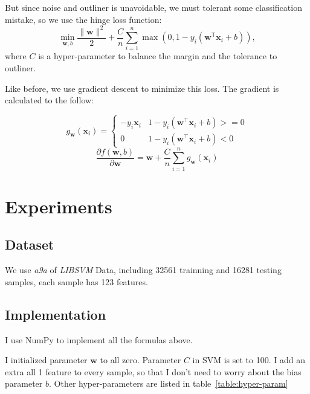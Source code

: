 \documentclass[journal, a4paper]{IEEEtran}
\begin{document}
But since noise and outliner is unavoidable, we must tolerant some classification mistake, so we use the hinge loss function:
\begin{equation}
    \min_{\mathbf{w}, b} \frac{\|\mathbf{w}\|^{2}}{2}+\frac{C}{n} \sum_{i=1}^{n} \max \left(0,1-y_{i}\left(\mathbf{w}^\mathsf{T} \mathbf{x}_{i}+b\right)\right),
\end{equation}
where $C$ is a hyper-parameter to balance the margin and the tolerance to outliner.

Like before, we use gradient descent to minimize this loss. The gradient is calculated to the follow:

\begin{equation}
    g_{\mathbf{w}}\left(\mathbf{x}_{i}\right)=
    \left\{\begin{array}{ll}
        -y_i \mathbf{x}_{i} & 1-y_i\left(\mathbf{w}^{\top} \mathbf{x}_{i}+b\right)>=0 \\
        0 & 1-y_i\left(\mathbf{w}^{\top} \mathbf{x}_{i}+b\right)<0
    \end{array}\right.
\end{equation}
\begin{equation}
    \frac{\partial f(\mathbf{w}, b)}{\partial\mathbf{w}}=\mathbf{w}+\frac{C}{n} \sum_{i=1}^{n} g_{\mathbf{w}}\left(\mathbf{x}_{i}\right)
\end{equation}

\section{Experiments}
\subsection{Dataset}

We use \emph{a9a} of \emph{LIBSVM} Data, including 32561 trainning and 16281 testing samples, each sample has 123 features.

\subsection{Implementation}

I use NumPy to implement all the formulas above.

I initialized parameter $\mathbf{w}$ to all zero. Parameter $C$ in SVM is set to 100. I add an extra all 1 feature to every sample, so that I don’t need to worry about the bias parameter $b$. Other hyper-parameters are listed in table~\ref{table:hyper-param}
\end{document}
